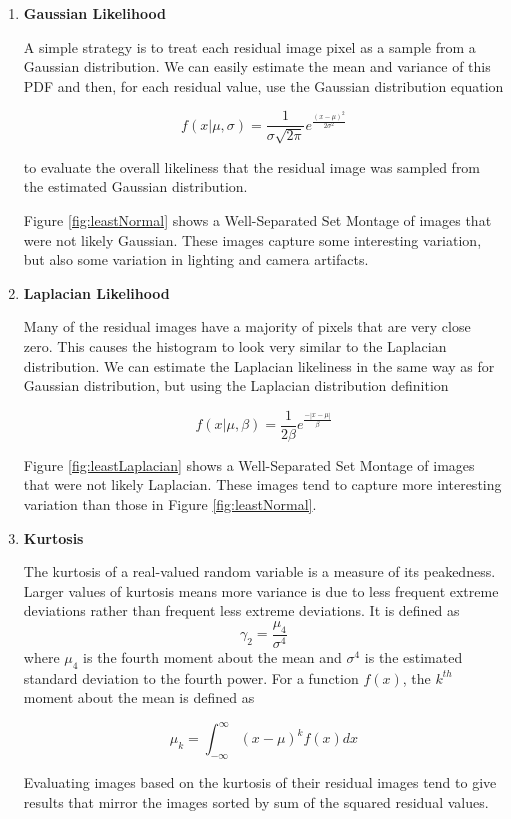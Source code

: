 \begin{enumerate}
\item{\textbf{Gaussian Likelihood}}

A simple strategy is to treat each residual image pixel as a sample from a Gaussian distribution.  We can easily estimate the mean and variance of this PDF and then, for each residual value, use the Gaussian distribution equation 

$$f(x|\mu,\sigma)=\frac{1}{\sigma\sqrt{2\pi}}e^{\frac{(x-\mu)^2}{2\sigma^2}}$$

to evaluate the overall likeliness that the residual image was sampled from the estimated Gaussian distribution.  

Figure \ref{fig:leastNormal} shows a Well-Separated Set Montage of images that were not likely Gaussian.  These images capture some interesting variation, but also some variation in lighting and camera artifacts.

\item{\textbf{Laplacian Likelihood}}

Many of the residual images have a majority of pixels that are very close zero.  This causes the histogram to look very similar to the Laplacian distribution.  We can estimate the Laplacian likeliness in the same way as for Gaussian distribution, but using the Laplacian distribution definition

$$f(x|\mu,\beta)=\frac{1}{2\beta}e^{\frac{-|x-\mu|}{\beta}}$$

Figure \ref{fig:leastLaplacian} shows a Well-Separated Set Montage of images that were not likely Laplacian.  These images tend to capture more interesting variation than those in Figure \ref{fig:leastNormal}.

\item{\textbf{Kurtosis}}

The kurtosis of a real-valued random variable is a measure of its peakedness.  Larger values of kurtosis means more variance is due to less frequent extreme deviations rather than frequent less extreme deviations.  It is defined as $$\gamma_2=\frac{\mu_4}{\sigma^4}$$ where $\mu_4$ is the fourth moment about the mean and $\sigma^4$ is the estimated standard deviation to the fourth power.  For a function $f(x)$, the $k^{th}$ moment about the mean is defined as 

$$\mu_k = \int_{-\infty}^{\infty}{(x-\mu)^kf(x)dx}$$

Evaluating images based on the kurtosis of their residual images tend to give results that mirror the images sorted by sum of the squared residual values.   


\end{enumerate}
